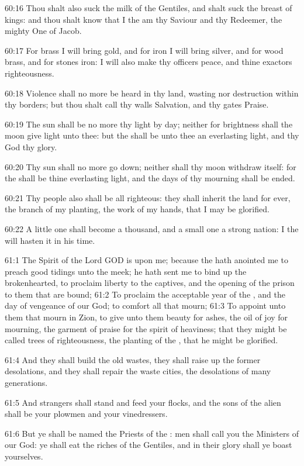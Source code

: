60:16 Thou shalt also suck the milk of the Gentiles, and shalt suck the breast of kings: and thou shalt know that I the \LORD am thy Saviour and thy Redeemer, the mighty One of Jacob.

60:17 For brass I will bring gold, and for iron I will bring silver, and for wood brass, and for stones iron: I will also make thy officers peace, and thine exactors righteousness.

60:18 Violence shall no more be heard in thy land, wasting nor destruction within thy borders; but thou shalt call thy walls Salvation, and thy gates Praise.

60:19 The sun shall be no more thy light by day; neither for brightness shall the moon give light unto thee: but the \LORD shall be unto thee an everlasting light, and thy God thy glory.

60:20 Thy sun shall no more go down; neither shall thy moon withdraw itself: for the \LORD shall be thine everlasting light, and the days of thy mourning shall be ended.

60:21 Thy people also shall be all righteous: they shall inherit the land for ever, the branch of my planting, the work of my hands, that I may be glorified.

60:22 A little one shall become a thousand, and a small one a strong nation: I the \LORD will hasten it in his time.

61:1 The Spirit of the Lord GOD is upon me; because the \LORD hath anointed me to preach good tidings unto the meek; he hath sent me to bind up the brokenhearted, to proclaim liberty to the captives, and the opening of the prison to them that are bound; 61:2 To proclaim the acceptable year of the \LORD, and the day of vengeance of our God; to comfort all that mourn; 61:3 To appoint unto them that mourn in Zion, to give unto them beauty for ashes, the oil of joy for mourning, the garment of praise for the spirit of heaviness; that they might be called trees of righteousness, the planting of the \LORD, that he might be glorified.

61:4 And they shall build the old wastes, they shall raise up the former desolations, and they shall repair the waste cities, the desolations of many generations.

61:5 And strangers shall stand and feed your flocks, and the sons of the alien shall be your plowmen and your vinedressers.

61:6 But ye shall be named the Priests of the \LORD: men shall call you the Ministers of our God: ye shall eat the riches of the Gentiles, and in their glory shall ye boast yourselves.

